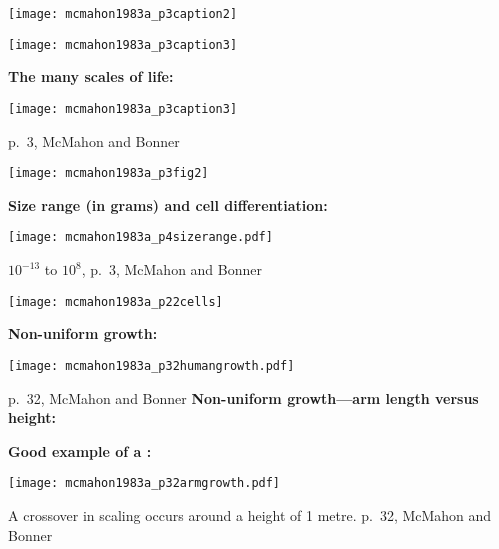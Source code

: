 \begin{marginfigure}[]
  \texttt{[image: mcmahon1983a\_p3caption2]}
\end{marginfigure}

\begin{marginfigure}[]
  \texttt{[image: mcmahon1983a\_p3caption3]}
\end{marginfigure}

\textbf{The many scales of life:}

\begin{marginfigure}[]
  \texttt{[image: mcmahon1983a\_p3caption3]}
\end{marginfigure}

{\small p.\ 3, McMahon and Bonner\cite{mcmahon1983a}}

\begin{marginfigure}[]
  \texttt{[image: mcmahon1983a\_p3fig2]}    
\end{marginfigure}

\textbf{Size range (in grams) and cell differentiation:}

\begin{marginfigure}[]
  \texttt{[image: mcmahon1983a\_p4sizerange.pdf]}\\
\end{marginfigure}

{\tiny $10^{-13}$ to $10^{8}$, p.\ 3, McMahon and Bonner\cite{mcmahon1983a}}
\begin{marginfigure}[]
  \texttt{[image: mcmahon1983a\_p22cells]}
\end{marginfigure}


\textbf{Non-uniform growth:}

\begin{marginfigure}[]
  \texttt{[image: mcmahon1983a\_p32humangrowth.pdf]}    
\end{marginfigure}


\small{p.\ 32, McMahon and Bonner\cite{mcmahon1983a}}
\textbf{Non-uniform growth---arm length versus height:}

\textbf{Good example of a :}
\begin{marginfigure}[]
  \texttt{[image: mcmahon1983a\_p32armgrowth.pdf]}
\end{marginfigure}


A \alert{crossover} in scaling occurs around a height of 1 metre.
\small{p.\ 32, McMahon and Bonner\cite{mcmahon1983a}}

